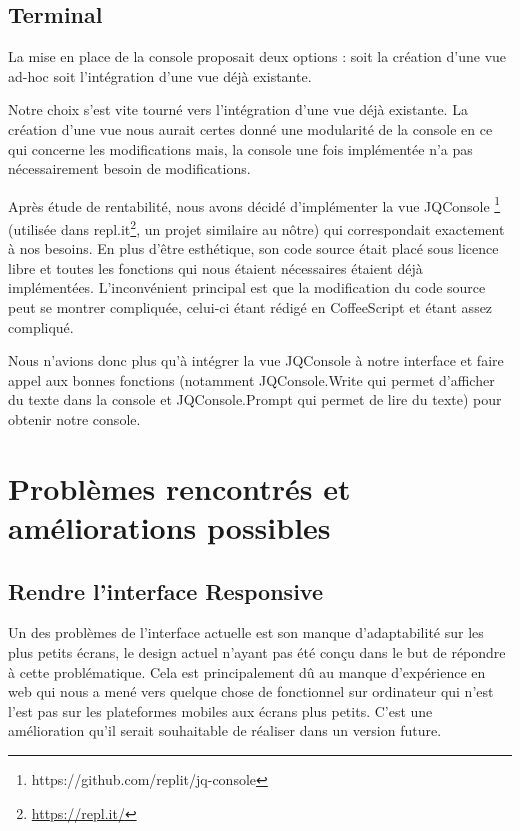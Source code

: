 \subsection{Terminal}
\label{subsec-terminal}

\par La mise en place de la console proposait deux options : soit la création d'une vue ad-hoc soit l'intégration d'une vue déjà existante.

\par Notre choix s'est vite tourné vers l'intégration d'une vue déjà existante. La création d'une vue nous aurait certes donné une modularité de la console en ce qui concerne les modifications mais, la console une fois implémentée n'a pas nécessairement besoin de modifications.

\par Après étude de rentabilité, nous avons décidé d'implémenter la vue JQConsole \footnote{https://github.com/replit/jq-console} (utilisée dans repl.it\footnote{\url{https://repl.it/}}, un projet similaire au nôtre) qui correspondait exactement à nos besoins. En plus d'être esthétique, son code source était placé sous licence libre et toutes les fonctions qui nous étaient nécessaires étaient déjà implémentées. L'inconvénient principal est que la modification du code source peut se montrer compliquée, celui-ci étant rédigé en CoffeeScript et étant assez compliqué.

\par Nous n'avions donc plus qu'à intégrer la vue JQConsole à notre interface et faire appel aux bonnes fonctions (notamment JQConsole.Write qui permet d'afficher du texte dans la console et JQConsole.Prompt qui permet de lire du texte) pour obtenir notre console.

\section{Problèmes rencontrés et améliorations possibles}

\subsection{Rendre l'interface Responsive}
\par Un des problèmes de l'interface actuelle est son manque d'adaptabilité sur les plus petits écrans, le design actuel n'ayant pas été conçu dans le but de répondre à cette problématique. Cela est principalement dû au manque d'expérience en web qui nous a mené vers quelque chose de fonctionnel sur ordinateur qui n'est l'est pas sur les plateformes mobiles aux écrans plus petits. C'est une amélioration qu'il serait souhaitable de réaliser dans un version future.

